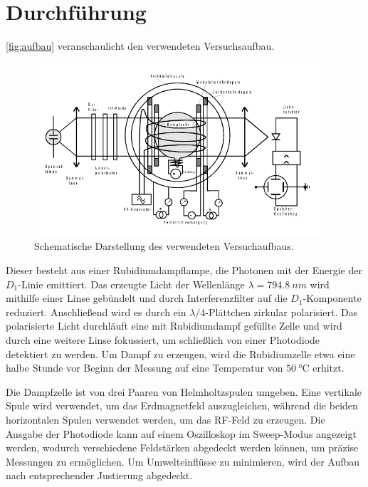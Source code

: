 \section{Durchführung}
\label{sec:Durchführung}

\autoref{fig:aufbau} veranschaulicht den verwendeten Versuchsaufbau.
\begin{figure}
    \centering
    \includegraphics[width=0.95\textwidth]{pictures/Aufbau2.pdf}
    \caption{Schematische Darstellung des verwendeten Versuchaufbaus. \cite{v21}}
    \label{fig:aufbau}
\end{figure} 

Dieser besteht aus einer Rubidiumdampflampe, die Photonen mit der Energie der $D_1$-Linie emittiert. 
Das erzeugte Licht der Wellenlänge $\lambda = \qty{794.8}{nm}$ wird mithilfe einer Linse gebündelt und 
durch Interferenzfilter auf die $D_1$-Komponente reduziert. 
Anschließend wird es durch ein $\lambda/4$-Plättchen zirkular polarisiert. 
Das polarisierte Licht durchläuft eine mit Rubidiumdampf gefüllte Zelle
und wird durch eine weitere Linse fokussiert, um schließlich von einer Photodiode detektiert zu werden. 
Um Dampf zu erzeugen, wird die Rubidiumzelle etwa eine halbe Stunde vor Beginn der Messung auf eine Temperatur von $\SI{50}{\celsius}$ erhitzt.

Die Dampfzelle ist von drei Paaren von Helmholtzspulen umgeben. 
Eine vertikale Spule wird verwendet, um das Erdmagnetfeld auszugleichen, 
während die beiden horizontalen Spulen verwendet werden, um das RF-Feld zu erzeugen. 
Die Ausgabe der Photodiode kann auf einem Oszilloskop im Sweep-Modus angezeigt werden, 
wodurch verschiedene Feldstärken abgedeckt werden können, um präzise Messungen zu ermöglichen. 
Um Umwelteinflüsse zu minimieren, wird der Aufbau nach entsprechender Justierung abgedeckt.

